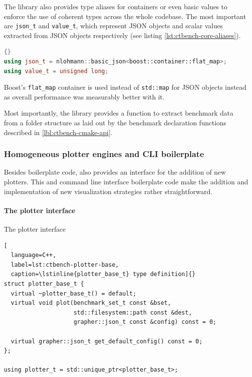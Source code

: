 \documentclass[../../main.tex]{subfiles}
\begin{document}
The \grapher library also provides type aliases for containers or even basic
values to enforce the use of coherent types across the whole codebase. The most
important are \lstinline{json_t} and \lstinline{value_t}, which represent JSON
objects and scalar values extracted from JSON objects respectively (see listing
\ref{lst:ctbench-core-aliases}).

\begin{lstlisting}[language=C++, label=lst:ctbench-core-aliases]{}
using json_t = nlohmann::basic_json<boost::container::flat_map>;
using value_t = unsigned long;
\end{lstlisting}

Boost's \lstinline{flat_map} container is used instead of \lstinline{std::map}
for JSON objects instead as overall performance was measurably better with it.

Most importantly, the \grapher library provides a function to extract benchmark
data from a folder structure as laid out by the benchmark declaration functions
described in \ref{lbl:ctbench-cmake-api}.

\subsubsection{Homogeneous plotter engines and CLI boilerplate}

Besides boilerplate code, \grapher also provides an interface for the addition
of new plotters. This and command line interface boilerplate code make the
addition and implementation of new visualization strategies rather
straightforward.

\paragraph{The plotter interface}

The plotter interface

\begin{lstlisting}[
  language=C++,
  label=lst:ctbench-plotter-base,
  caption=\lstinline{plotter_base_t} type definition]{}
struct plotter_base_t {
  virtual ~plotter_base_t() = default;
  virtual void plot(benchmark_set_t const &bset,
                    std::filesystem::path const &dest,
                    grapher::json_t const &config) const = 0;

  virtual grapher::json_t get_default_config() const = 0;
};

using plotter_t = std::unique_ptr<plotter_base_t>;
\end{lstlisting}
\end{document}
